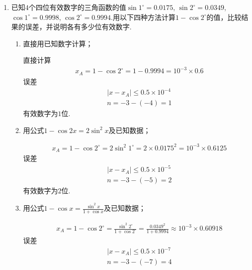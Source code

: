 \documentclass[a4paper]{article}
\begin{document}
\courseheader
{}

\begin{enumerate}
  \setlength{\itemsep}{3\parskip}

  \item 已知$4$个四位有效数字的三角函数的值$\sin 1^\circ =0.0175$, $\sin 2^\circ =0.0349$, $\cos 1 ^ \circ = 0.9998$, $\cos 2 ^\circ = 0.9994$.用以下四种方法计算$1 - \cos 2 ^ \circ$的值，比较结果的误差，并说明各有多少位有效数字.
  \begin{enumerate}[label=（\arabic*）]
    \item 直接用已知数字计算；
    \begin{solution}
      直接计算
      \begin{align*}
        &x_A=1 - \cos 2^\circ = 1 - 0.9994 = 10^{-3}\times0.6
        \end{align*}
      误差
        \begin{align*}
        &\left |  x-x_A\right | \le 0.5\times10^{-4}\\
        &n=-3-(-4)=1
      \end{align*}
      有效数字为$1$位.
    \end{solution}
    \item 用公式$1-\cos 2x = 2 \sin^2 x$及已知数据；
    \begin{solution}
      \begin{align*}
        &x_A=1 - \cos 2^\circ = 2\sin^2 1^\circ = 2\times 0.0175^2 =10^{-3}\times0.6125
      \end{align*}
      误差
        \begin{align*}
        &\left |  x-x_A\right | \le 0.5\times10^{-5}\\
        &n=-3-(-5)=2
      \end{align*}
      有效数字为$2$位.
    \end{solution}
    \item 用公式$1-\cos x = \frac{\sin^2 x}{1+\cos x}$及已知数据；
    \begin{solution}
      \begin{align*}
        &x_A=1 - \cos 2^\circ = \frac{\sin^2 2^\circ}{1+\cos 2^\circ} = \frac{0.0349^2}{1+0.9994}\approx 10^{-3}\times0.60918
      \end{align*}
      误差
      \begin{align*}
        &\left |  x-x_A\right | \le 0.5\times10^{-7}\\
        &n=-3-(-7)=4
      \end{align*}

\end{solution}
\end{enumerate}
\end{enumerate}
\end{document}
